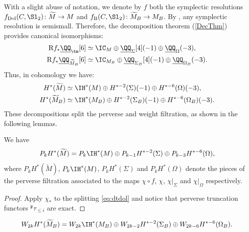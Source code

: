 With a slight abuse of notation, we denote by $f$ both the symplectic resolutions $f_{\mathrm{Dol}}(C,\Sl_2) \colon \widetilde{M} \to M$ and $f_{\mathrm{B}}(C,\Sl_2) \colon \widetilde{M}_B \to M_B$. By \cite[Lem.\,2.11]{Kaledin06}, any symplectic resolution is semismall. Therefore, the decomposition theorem (\cref{DecThm}) provides canonical isomorphisms:
\begin{align}\label{eq:dtdol}
\mathrm{R}f_*\underline{\QQ}_{\tm}[6]&\simeq \IC_{M}\oplus\underline{\QQ}_{\Sigma}[4](-1)\oplus \underline{\QQ}_{\Omega}(-3),
\\
\label{eq:dtb}
\mathrm{R}f_*\underline{\QQ}_{\widetilde{M}_B}[6]&\simeq \IC_{M_B}\oplus\underline{\QQ}_{\Sigma_B}[4](-1)\oplus \underline{\QQ}_{\Omega_B}(-3).
\end{align}
Thus, in cohomology
we have:
\begin{align}
H^*(\widetilde{M})&\simeq \IH^*(M)\oplus H^{*-2}(\Sigma)(-1)\oplus H^{*-6}(\Omega)(-3),\\ \label{eq:decompositioncohMtilde}
H^*(\widetilde{M}_B)&\simeq \IH^*(M_B)\oplus H^{*-2}(\Sigma_B)(-1)\oplus H^{*-6}(\Omega_B)(-3).
\end{align}
These decompositions split the perverse and weight filtration, as shown in the following lemmas.

\begin{lem}\label{lem:splittingp}
We have
\[
P_k H^*(\widetilde{M})=P_k \IH^*(M)\oplus P_{k-1}H^{*-2}(\Sigma)\oplus P_{k-3}H^{*-6}(\Omega),
\]
where $P_k H^*(\widetilde{M})$, $P_k \IH^*(M)$, $P_{k}H^{*}(\Sigma)$ and $ P_{k}H^{*}(\Omega)$ denote the pieces of the perverse filtration associated to the maps $\chi \circ f$, $\chi$, $\chi|_{\Sigma}$ and $\chi|_{\Omega}$ respectively.
\end{lem}
\begin{proof}
Apply $\chi_*$ to the splitting \eqref{eq:dtdol} and notice that perverse truncation functors $^{\mathfrak{p}}\tau_{\leq i}$ are exact.
\end{proof}

\skpt
\begin{lem}\label{lem:splittingw}
\mbox{}\vspace*{-1.1\baselineskip}
\[
W_{2k} H^*(\widetilde{M}_B)=W_{2k}\IH^*(M_B)\oplus W_{2k-2}H^{*-2}(\Sigma_B)\oplus W_{2k-6}H^{*-6}(\Omega_B).
\]
\end{lem}

